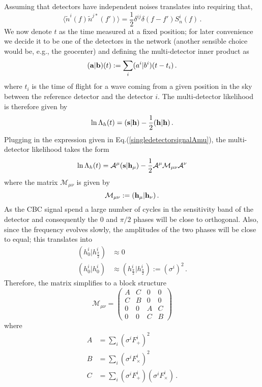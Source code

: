 \documentclass[aps, prd, twocolumn, superscriptaddress, nofootinbib]{revtex4-1}
\begin{document}
Assuming that detectors have independent noises translates into requiring that,
\begin{equation}
\langle \tilde{n}^i(f)\tilde{n}^{j*}(f')\rangle=\frac{1}{2}\delta^{ij}\delta(f-f')S^i_n(f)\, .
\end{equation}
We now denote $t$ as the time measured at a fixed position; for later convenience we decide it to be one of the detectors in the network (another sensible choice would be, e.g., the geocenter) and defining the multi-detector inner product as
\begin{equation}
({\bf a}|{\bf b})(t):= \sum_i(a^i|b^i)(t-t_i)\, .
\end{equation}
where $t_i$ is the time of flight for a wave coming from a given position in the sky between the reference detector and the detector $i$.
The multi-detector likelihood is therefore given by
\begin{equation}
\ln\Lambda_h(t)=({\bf s}|{\bf h})-\frac{1}{2}({\bf h}|{\bf h})\, .
\end{equation}
Plugging in the expression given in Eq.(\ref{singledetectorsignalAmu}), the multi-detector likelihood takes the form
\begin{equation}\label{loglikeAmu}
\ln\Lambda_h(t)=\mathcal{A}^\mu({\bf s}|{\bf h}_\mu)-\frac{1}{2}\mathcal{A}^\mu\mathcal{M}_{\mu\nu}\mathcal{A}^\nu
\end{equation}
where the matrix $\mathcal{M}_{\mu\nu}$ is given by
\begin{equation}
\mathcal{M}_{\mu\nu}:=({\bf h}_\mu|{\bf h}_\nu)\, .
\end{equation}
As the CBC signal spend a large number of cycles in the sensitivity band of the detector and consequently the 0 and $\pi/2$ phases will be close to orthogonal.  Also, since the frequency evolves slowly, the amplitudes of the two phases will be close to equal; this translates into
\begin{equation}
\begin{split}
(h_0^i|h^i_{\frac{\pi}{2}})&\approx 0 \\
(h_0^i|h_0^i)&\approx (h^i_{\frac{\pi}{2}}|h^i_{\frac{\pi}{2}}):=(\sigma^i)^2\, .
\end{split}
\end{equation}
Therefore, the matrix simplifies to a block structure
\begin{equation}
\mathcal{M}_{\mu\nu}=\begin{pmatrix} 
A & C & 0 & 0\\
C & B & 0 & 0\\
0 & 0 & A & C
\\ 0 & 0 & C &B
\end{pmatrix}
\end{equation}
where
\begin{equation}
\begin{split}
A&=\sum_i(\sigma^iF_+^i)^2\\
B&=\sum_i(\sigma^iF_\times^i)^2\\
C&=\sum_i(\sigma^iF_+^i)(\sigma^iF_\times^i)\, .
\end{split}
\end{equation}
\end{document}
